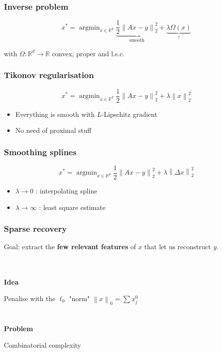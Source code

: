 \documentclass[aspectratio=169]{beamer}
\newcommand{\RR}{\mathbb{R}}
\newcommand{\rd}{\mathbb{R}^d}
\newcommand{\norm}[1]{\left\|#1\right\|}
\newcommand{\normtwosq}[1]{\left\|#1\right\|_2^2}
\newcommand{\onehalf}{\frac{1}{2}}
\DeclareMathOperator*{\argmin}{argmin}
\begin{document}
		\begin{frame}
		\frametitle{Inverse problem}
		\begin{equation}
		\nonumber
		x^* = \argmin_{x\in \rd}\underbrace{\onehalf\normtwosq{Ax-y}}_{\text{smooth}} + \underbrace{\lambda \Omega(x)}_{\text{?}}
		\end{equation}
		\begin{center}
		with $\Omega:\rd\to\RR$ convex, proper and l.s.c.
		\end{center}
		\end{frame}
		
		\begin{frame}
		\frametitle{Tikonov regularisation}
		\begin{equation}
		\nonumber x^* = \argmin_{x\in \rd}\onehalf\normtwosq{Ax-y} + \lambda\norm{x}_2^2
		\end{equation}
		\begin{itemize}
		\item Everything is smooth with $L$-Lipschitz gradient
		\item No need of proximal stuff
		\end{itemize}
		\end{frame}
		
		\begin{frame}
		\frametitle{Smoothing splines}
		\begin{equation}
		\nonumber x^* = \argmin_{x\in \rd}\onehalf\normtwosq{Ax-y} + \lambda\norm{\Delta x}_2^2
		\end{equation}
		\begin{itemize}
		\item $\lambda\to 0$ : interpolating spline
		\item $\lambda\to\infty$ : least square estimate
		\end{itemize}
		\end{frame}
		
		
		\begin{frame}
		\frametitle{Sparse recovery}
		\begin{center}
		Goal: extract the \textbf{few relevant features} of $x$ that let us reconstruct $y$.
		\quad \\ \quad \\ \quad \\
		\pause

		\textbf{Idea}
		
		Penalise with the $\ell_0$ "norm" $\norm{x}_0 = \sum x_j^0$
		\pause
		\quad \\ \quad \\ \quad \\
		\textbf{Problem}
		
		Combinatorial complexity
		\end{center}
		\end{frame}
		
\end{document}

